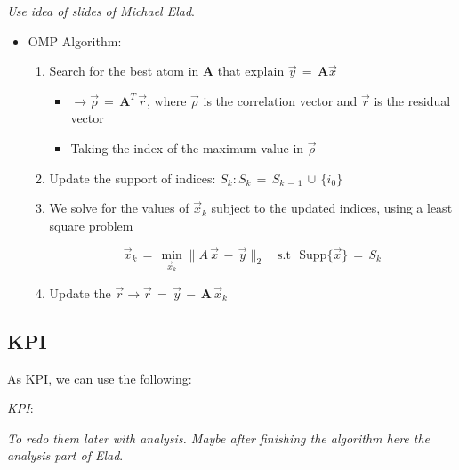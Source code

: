 \documentclass[12pt,a4paper]{book}
\begin{document}
\textit{Use idea of slides of Michael Elad}. 

\begin{itemize}

\item OMP Algorithm:

\begin{enumerate}
    \item Search for the best atom in $\boldsymbol A$ that explain $ \Vec{y} \,  =  \, \boldsymbol A \Vec{x}$ 
    
    \begin{itemize}
        \item $\rightarrow \Vec{\rho} \, = \, \boldsymbol A^T \, \Vec{r}$, where $\Vec{\rho}$ is the correlation vector and $\Vec{r}$ is the residual vector
        
        \item Taking the index of the maximum value in $\Vec{\rho}$
        
    \end{itemize}
    
    
    \item Update the support of indices: $S_k: S_k \, = \, S_{k \, - \, 1} \, \displaystyle\cup \, \{ i_0\}$
    
    \item We solve for the values of $\Vec{x}_k$ subject to the updated indices, using a least square problem
    
      \begin{equation}
         \Vec{x}_k \, = \, \min_{\Vec{x}_k} \lVert A \, \Vec{x} \, - \, \Vec{y} \rVert_2 \quad \text{s.t } \text{ Supp} \{\Vec{x}\} \, = \,  S_k
     \end{equation}
    
    
    \item Update the $\Vec{r} \rightarrow \Vec{r} \, = \, \Vec{y} \, - \, \boldsymbol A \, \Vec{x}_k$
    
\end{enumerate}


\end{itemize}


\subsection{KPI}

As KPI, we can use the following:


\textit{KPI}:

\textit{To redo them later with analysis. Maybe after finishing the algorithm here the analysis part of Elad}.
\end{document}

